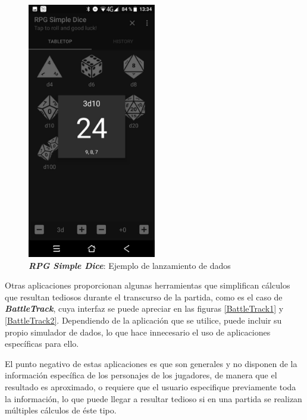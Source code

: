 \begin{figure}[H]
\begin{minipage}{0.35\textwidth}
        \includegraphics[width=0.5\textwidth]{Images/RPG_Simple_Dice_2.jpeg}
        \caption{\textit{\textbf{RPG Simple Dice}}: Ejemplo de lanzamiento de 
        dados}
        \label{SimpleDice2}        
    \end{minipage}
\end{figure}
\newpage
Otras aplicaciones proporcionan algunas herramientas que simplifican 
cálculos que resultan tediosos durante el transcurso de la partida, como 
es el caso de \textit{\textbf{BattleTrack}}, cuya interfaz se puede apreciar 
en las figuras \ref*{BattleTrack1} y \ref*{BattleTrack2}. Dependiendo de la aplicación 
que se utilice, puede incluir su propio simulador de dados, lo que hace 
innecesario el uso de aplicaciones específicas para ello. \medskip

El punto negativo de estas aplicaciones es que son generales y no disponen de 
la información específica de los personajes de los jugadores, de manera que 
el resultado es aproximado, o requiere que el usuario especifique previamente 
toda la información, lo que puede llegar a resultar tedioso si en una partida 
se realizan múltiples cálculos de éste tipo.


